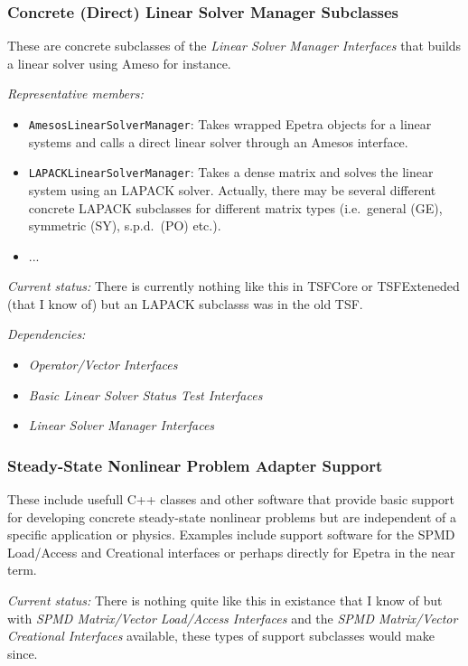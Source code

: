 \documentclass[pdf,ps2pdf,11pt]{SANDreport}
\begin{document}
%
\subsubsection{Concrete (Direct) Linear Solver Manager Subclasses}
%

These are concrete subclasses of the {}\textit{Linear Solver Manager
Interfaces} that builds a linear solver using Ameso for instance.

{}\textit{Representative members:}
\begin{itemize}
%
{}\item {}\texttt{AmesosLinearSolverManager}: Takes wrapped Epetra objects for
a linear systems and calls a direct linear solver through an Amesos interface.
%
{}\item {}\texttt{LAPACKLinearSolverManager}: Takes a dense matrix and solves
the linear system using an LAPACK solver.  Actually, there may be several
different concrete LAPACK subclasses for different matrix types (i.e.\ general
(GE), symmetric (SY), s.p.d.\ (PO) etc.).
%
{}\item ...
%
\end{itemize}

{}\textit{Current status:} There is currently nothing like this in TSFCore or
TSFExteneded (that I know of) but an LAPACK subclasss was in the old TSF.

{}\textit{Dependencies:}
\begin{itemize}
\item {}\textit{Operator/Vector Interfaces}
\item {}\textit{Basic Linear Solver Status Test Interfaces}
\item {}\textit{Linear Solver Manager Interfaces}
\end{itemize}

%
\subsubsection{Steady-State Nonlinear Problem Adapter Support}
%

These include usefull C++ classes and other software that provide basic
support for developing concrete steady-state nonlinear problems but are
independent of a specific application or physics.  Examples include support
software for the SPMD Load/Access and Creational interfaces or perhaps
directly for Epetra in the near term.

{}\textit{Current status:} There is nothing quite like this in existance that
I know of but with {}\textit{SPMD Matrix/Vector Load/Access Interfaces} and
the {}\textit{SPMD Matrix/Vector Creational Interfaces} available, these types
of support subclasses would make since.
\end{document}
